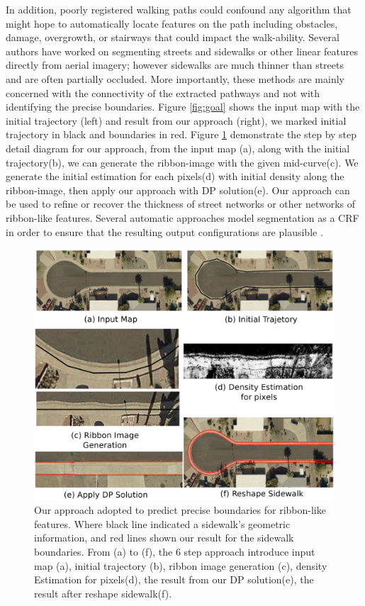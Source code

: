 
In addition, poorly registered walking paths could confound any algorithm that might hope to automatically locate features on the path including obstacles, damage, overgrowth, or stairways that could impact the walk-ability. 
Several authors\cite{femiani2009interval, femiani2007road} have worked on segmenting streets and sidewalks or other linear features directly from aerial imagery; however sidewalks are much thinner than streets and are often partially occluded. 
More importantly, these methods are mainly concerned with the connectivity of the extracted pathways and not with identifying the precise boundaries. 
Figure \ref{fig:goal} shows the input map with the initial trajectory (left) and result from our approach (right), we marked initial trajectory in black and boundaries in red.
Figure \ref{fig:fw_ov} demonstrate the step by step detail diagram for our approach, from the input map (a), along with the initial trajectory(b), we can generate the ribbon-image with the given mid-curve(c). 
We generate the initial estimation for each pixels(d) with initial density along the ribbon-image, then apply our approach with \ac{DP} solution(e). 
Our approach can be used to refine or recover the thickness of street networks or other networks of ribbon-like features. Several automatic approaches model segmentation as a \ac{CRF} in order to ensure that the resulting output configurations are plausible \cite{ActiveContou09, Rother2004-ou, Achanta:149300}.

\begin{figure}[H]
    \centering
    \includegraphics[width=\textwidth]{Figures/diagram.png}
    \caption[Framework Demonstration]{
    Our approach adopted to predict precise boundaries for ribbon-like features. Where black line indicated a sidewalk's geometric information, and red lines shown our result for the sidewalk boundaries. From (a) to (f), the 6 step approach introduce input map (a), initial trajectory (b), ribbon image generation (c), density Estimation for pixels(d), the result from our \ac{DP} solution(e), the result after reshape sidewalk(f).}
    \label{fig:fw_ov}
\end{figure}

